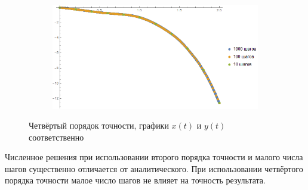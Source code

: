 \documentclass[a4paper,12pt,titlepage,finall]{article}
\begin{document}
\begin{enumerate}
\begin{figure}[h]
\begin{subfigure}{.5\textwidth}
\end{subfigure}%
\begin{subfigure}{.5\textwidth}
  \centering
  \includegraphics[width=\textwidth]{test_1_7_4_y.png}
\end{subfigure}
\caption{Четвёртый порядок точности, графики $x(t)$ и $y(t)$ соответственно}
\end{figure}
\par
Численное решения при использовании второго порядка точности и малого числа шагов существенно отличается от аналитического. При использовании четвёртого порядка точности малое число шагов не влияет на точность результата.
\end{enumerate}
\end{document}
